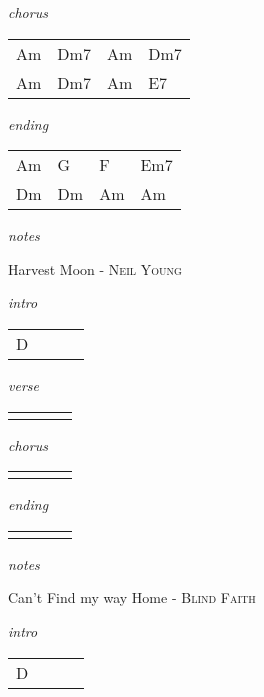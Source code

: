 \documentclass[12pt]{article}
\begin{document}
\textit{chorus}

\begin{tabular}{|P{1.25in}|P{1.25in}|P{1.25in}|P{1.25in}|}
  Am  & Dm7  & Am  & Dm7  \\
  Am  & Dm7  & Am  & E7  \\
\end{tabular}

\textit{ending}

\begin{tabular}{|P{1.25in}|P{1.25in}|P{1.25in}|P{1.25in}|}
  Am  & G  & F  & Em7  \\
  Dm  & Dm  & Am  & Am  \\
\end{tabular}

\textit{notes}

\newpage
{\Huge Harvest Moon} {\huge - \textsc{Neil Young}}

\huge
\textit{intro}

\begin{tabular}{|P{1.25in}|P{1.25in}|P{1.25in}|P{1.25in}|}
  D &   &   &   \\
\end{tabular}

\textit{verse}

\begin{tabular}{|P{1.25in}|P{1.25in}|P{1.25in}|P{1.25in}|}
    &   &   &   \\
\end{tabular}

\textit{chorus}

\begin{tabular}{|P{1.25in}|P{1.25in}|P{1.25in}|P{1.25in}|}
    &   &   &   \\
\end{tabular}

\textit{ending}

\begin{tabular}{|P{1.25in}|P{1.25in}|P{1.25in}|P{1.25in}|}
    &   &   &   \\
\end{tabular}

\textit{notes}

\newpage

{\Huge Can't Find my way Home} {\huge - \textsc{Blind Faith}}

\huge
\textit{intro}

\begin{tabular}{|P{1.25in}|P{1.25in}|P{1.25in}|P{1.25in}|}
  D &   &   &   \\
\end{tabular}
\end{document}
